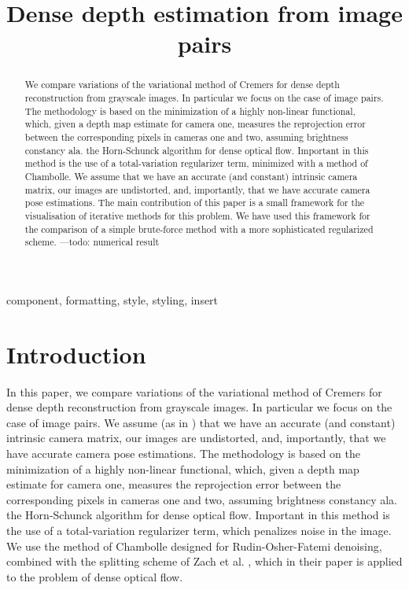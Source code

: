 \documentclass[conference]{IEEEtran}
\begin{document}
\title{Dense depth estimation from image pairs}

\author{
}

\maketitle

\begin{abstract}
We compare variations of the variational method of Cremers for dense
depth reconstruction from grayscale images. In particular we focus on the case of image pairs.
The methodology is based on the minimization of a highly non-linear functional, which, given
a depth map estimate for camera one, measures the reprojection error between the corresponding
pixels in cameras one and two, assuming brightness constancy ala. the Horn-Schunck algorithm for dense optical flow.
Important in this method is the use of a total-variation regularizer term, minimized with a method of Chambolle.
We assume that we have an accurate (and constant) intrinsic camera matrix,
our images are undistorted, and, importantly, that we have accurate camera pose estimations.
The main contribution of this paper is a small framework for the visualisation of iterative methods for this problem. We have
used this framework for the comparison of a simple brute-force method with a more sophisticated regularized scheme.
---todo: numerical result

\end{abstract}

\begin{IEEEkeywords}
component, formatting, style, styling, insert
\end{IEEEkeywords}

\section{Introduction}
In this paper, we compare variations of the variational method of Cremers \cite{dense_geometry} for dense
depth reconstruction from grayscale images. In particular we focus on the case of image pairs.
We assume (as in \cite{dense_geometry}) that we have an accurate (and constant) intrinsic camera matrix,
our images are undistorted, and, importantly, that we have accurate camera pose estimations.
The methodology is based on the minimization of a highly non-linear functional, which, given
a depth map estimate for camera one, measures the reprojection error between the corresponding
pixels in cameras one and two, assuming brightness constancy ala. the Horn-Schunck algorithm \cite{horn_schunck} for dense optical flow.
Important in this method is the use of a total-variation regularizer term, which penalizes noise in the image.
We use the method of Chambolle \cite{chambolle} designed for Rudin-Osher-Fatemi \cite{ROF} denoising,
combined with the splitting scheme of Zach et al. \cite{tv_optical_flow}, which in their paper is applied
to the problem of dense optical flow.
\end{document}
